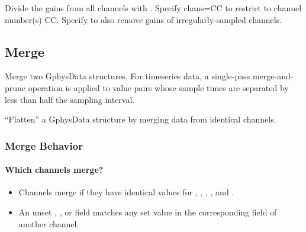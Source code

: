 \documentclass[letterpaper,11pt,english]{sphinxmanual}
\begin{document}
\begin{fulllineitems}
\end{fulllineitems}


Divide the gains from all channels  with . Specify
chans=CC to restrict to channel number(s) CC. Specify  to also
remove gains of irregularly-sampled channels.


\subsection{Merge}
\label{\detokenize{src/Processing/processing:merge}}\label{\detokenize{src/Processing/processing:id1}}

\begin{fulllineitems}
\end{fulllineitems}


Merge two GphysData structures. For timeseries data, a single-pass merge-and-prune
operation is applied to value pairs whose sample times are separated by less than
half the sampling interval.


\begin{fulllineitems}
\end{fulllineitems}


“Flatten” a GphysData structure by merging data from identical channels.


\subsubsection{Merge Behavior}
\label{\detokenize{src/Processing/processing:merge-behavior}}

\paragraph{Which channels merge?}
\label{\detokenize{src/Processing/processing:which-channels-merge}}\begin{itemize}
\item {} 
Channels merge if they have identical values for , , , , and .

\item {} 
An unset , , or  field matches any set value in the corresponding field of another channel.

\end{itemize}
\end{document}

